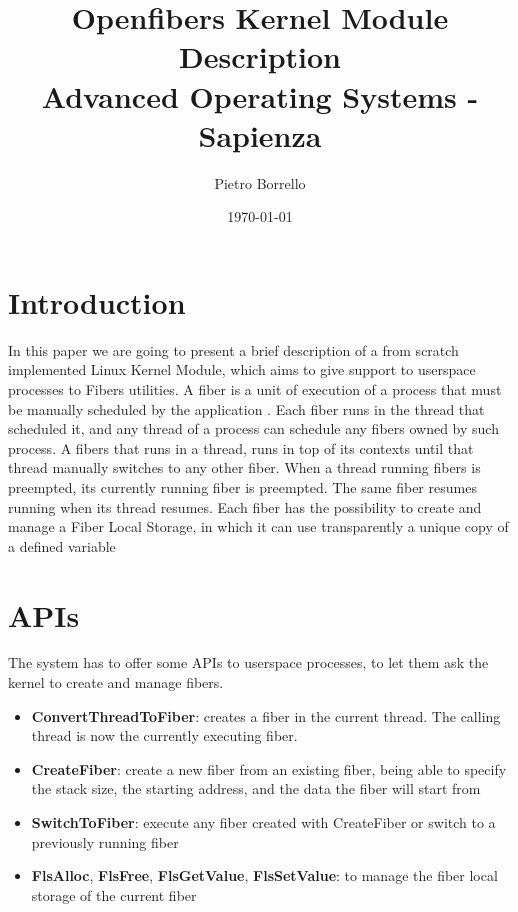 \documentclass[11pt]{article}
\title{Openfibers Kernel Module Description \\ \bigskip \large Advanced Operating Systems -  Sapienza}
\author{Pietro Borrello}
\date{\today}
\begin{document}
\maketitle

\tableofcontents
\newpage

\section{Introduction}
In this paper we are going to present a brief description of a from scratch implemented Linux Kernel Module, which aims to give support to userspace processes to Fibers utilities. A fiber is a unit of execution of a process that must be manually scheduled by the application \cite{fibers}. Each fiber runs in the thread that scheduled it, and any thread of a process can schedule any fibers owned by such process. A fibers that runs in a thread, runs in top of its contexts until that thread manually switches to any other fiber. When a thread running fibers is preempted, its currently running fiber is preempted. The same fiber resumes running when its thread resumes. Each fiber has the possibility to create and manage a Fiber Local Storage, in which it can use transparently a unique copy of a defined variable

\section{APIs}
The system has to offer some APIs to userspace processes, to let them ask the kernel to create and manage fibers.

\begin{itemize}
\item{\textbf{ConvertThreadToFiber}}: creates a fiber in the current thread. The calling thread is now the currently executing fiber.
\item{\textbf{CreateFiber}}: create a new fiber from an existing fiber, being able to specify the stack size, the starting address, and the data the fiber will start from
\item{\textbf{SwitchToFiber}}: execute any fiber created with CreateFiber or switch to a previously running fiber
\item{\textbf{FlsAlloc}, \textbf{FlsFree}, \textbf{FlsGetValue}, \textbf{FlsSetValue}}: to manage the fiber local storage of the current fiber
\end{itemize}
\end{document}
